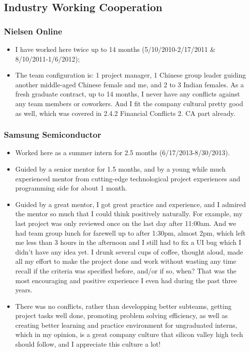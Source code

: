 \documentclass[9pt,b5paper]{article}
\begin{document}
\subsection{Industry Working Cooperation}
\label{sec-3-2}
\subsubsection{Nielsen Online}
\label{sec-3-2-1}
\begin{itemize}
\item I have worked here twice up to 14 months (5/10/2010-2/17/2011 \& 8/10/2011-1/6/2012);
\item The team configuration is: 1 project manager, 1 Chinese group leader guiding another middle-aged Chinese female and me, and 2 to 3 Indian females. As a fresh graduate contract, up to 14 months, I never have any conflicts against any team members or coworkers. And I fit the company cultural pretty good as well, which was covered in 2.4.2 Financial Conflicts 2. CA part already.
\end{itemize}
\subsubsection{Samsung Semiconductor}
\label{sec-3-2-2}
\begin{itemize}
\item Worked here as a summer intern for 2.5 months (6/17/2013-8/30/2013).
\item Guided by a senior mentor for 1.5 months, and by a young while much experienced mentor from cutting-edge technological project experiences and programming side for about 1 month.
\item Guided by a great mentor, I got great practice and experience, and I admired the mentor so much that I could think positively naturally. For example, my last project was only reviewed once on the last day after 11:00am. And we had team group lunch for farewell up to after 1:30pm, almost 2pm, which left me less than 3 hours in the afternoon and I still had to fix a UI bug which I didn't have any idea yet. I drunk several cups of coffee, thought aloud, made all my effort to make the project done and work without wasting any time recall if the criteria was specified before, and/or if so, when? That was the most encouraging and positive experience I even had during the past three years.
\item There was no conflicts, rather than developping better subteams, getting project tasks well done, promoting problem solving efficiency, as well as creating better learning and practice environment for ungraduated interns, which in my opinion, is a great company culture that silicon valley high tech should follow, and I appreciate this culture a lot!
\end{itemize}
\end{document}
